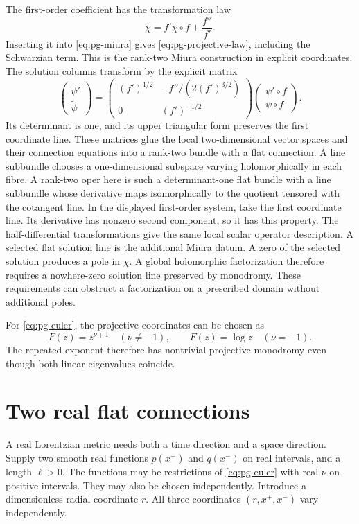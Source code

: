 The first-order coefficient has the transformation law
\[
 \widetilde\chi=f'\chi\circ f+\frac{f''}{f'}.
\]
Inserting it into \eqref{eq:pg-miura} gives \eqref{eq:pg-projective-law}, including the Schwarzian term.
This is the rank-two Miura construction in explicit coordinates.
The solution columns transform by the explicit matrix
\[
 \begin{pmatrix}\widetilde\psi'\\\widetilde\psi\end{pmatrix}
 =\begin{pmatrix}(f')^{1/2}&-f''/(2(f')^{3/2})\\0&(f')^{-1/2}\end{pmatrix}
   \begin{pmatrix}\psi'\circ f\\\psi\circ f\end{pmatrix}.
\]
Its determinant is one, and its upper triangular form preserves the first coordinate line.
These matrices glue the local two-dimensional vector spaces and their connection equations into a rank-two bundle with a flat connection.
A line subbundle chooses a one-dimensional subspace varying holomorphically in each fibre.
A rank-two oper here is such a determinant-one flat bundle with a line subbundle whose derivative maps isomorphically to the quotient tensored with the cotangent line.
In the displayed first-order system, take the first coordinate line.
Its derivative has nonzero second component, so it has this property.
The half-differential transformations give the same local scalar operator description.
A selected flat solution line is the additional Miura datum.
A zero of the selected solution produces a pole in $\chi$.
A global holomorphic factorization therefore requires a nowhere-zero solution line preserved by monodromy.
These requirements can obstruct a factorization on a prescribed domain without additional poles.

For \eqref{eq:pg-euler}, the projective coordinates can be chosen as
\[
 F(z)=z^{\nu+1}\quad(\nu\ne-1),\qquad F(z)=\log z\quad(\nu=-1).
\]
The repeated exponent therefore has nontrivial projective monodromy even though both linear eigenvalues coincide.

\section{Two real flat connections}

A real Lorentzian metric needs both a time direction and a space direction.
Supply two smooth real functions $p(x^+)$ and $q(x^-)$ on real intervals, and a length $\ell>0$.
The functions may be restrictions of \eqref{eq:pg-euler} with real $\nu$ on positive intervals.
They may also be chosen independently.
Introduce a dimensionless radial coordinate $r$.
All three coordinates $(r,x^+,x^-)$ vary independently.

